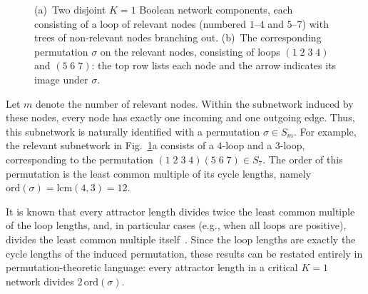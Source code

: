\documentclass[11pt, reqno]{elsarticle}%
\theoremstyle{plain}
\begin{document}
\begin{figure}[h]
\caption{(a)~Two disjoint $K=1$ Boolean network components, each consisting of
a loop of relevant nodes (numbered $1$--$4$ and $5$--$7$) with trees of
non-relevant nodes branching out. (b)~The corresponding permutation $\sigma$
on the relevant nodes, consisting of loops $(1\;2\;3\;4)$ and $(5\;6\;7)$:
the top row lists each node and the arrow indicates its image under $\sigma$.}
\label{fig:k1networks}
\end{figure}

Let $m$ denote the number of relevant nodes. Within the subnetwork induced by these nodes, every node has exactly one incoming and one outgoing edge. Thus, this subnetwork is naturally identified with a permutation $\sigma\in S_m$. For example, the relevant subnetwork in Fig.~\ref{fig:k1networks}a consists of a $4$-loop and a $3$-loop, corresponding to the permutation $(1\;2\;3\;4)(5\;6\;7)\in S_7$. The order of this permutation is the least common multiple of its cycle lengths, namely $\mathrm{ord}(\sigma)=\mathrm{lcm}(4,3)=12$.

It is known that every attractor length divides twice the least common multiple of the loop lengths, and, in particular cases (e.g., when all loops are positive), divides the least common multiple itself~\cite{Drosselcriticalk1network,flybjergexact}. Since the loop lengths are exactly the cycle lengths of the induced permutation, these results can be restated entirely in permutation-theoretic language: every attractor length in a critical $K=1$ network divides $2\,\mathrm{ord}(\sigma)$. 
\end{document}
